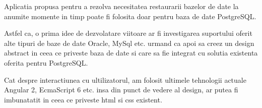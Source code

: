 Aplicatia propusa pentru a rezolva necesitatea restaurarii bazelor de date la anumite momente in timp poate fi folosita doar pentru baza de date PostgreSQL. 
\par
Astfel ca, o prima idee de dezvolatare viitoare ar fi investigarea suportului oferit alte tipuri de baze de date Oracle, MySql etc. urmand ca apoi sa creez un design abstract in ceea ce priveste baza de date si care sa fie integrat cu solutia existenta oferita pentru PostgreSQL.
\par
Cat despre interactiunea cu ultilizatorul, am folosit ultimele tehnologii actuale Angular 2, EcmaScript 6 etc. insa din punct de vedere al design, ar putea fi imbunatatit in ceea ce priveste html si css existent.